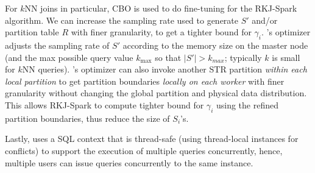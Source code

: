For $k$NN joins in particular, CBO is used to do fine-tuning for the
RKJ-Spark algorithm. We can increase the sampling rate used to
generate $S'$ and/or partition table $R$ with finer granularity, to
get a tighter bound for $\gamma_i$. \name's optimizer adjusts the
sampling rate of $S'$ according to the memory size on the master node
(and the max possible query value $k_{\max}$ so that $|S'|>k_{max}$;
typically $k$ is small for $k$NN queries). \name's optimizer can also
invoke another STR partition {\em within each local partition} to get
partition boundaries {\em locally on each worker} with finer
granularity without changing the global partition and physical data
distribution. This allows RKJ-Spark to compute tighter bound for
$\gamma_i$ using the refined partition boundaries, thus reduce the
size of $S_i$'s.


Lastly, \name uses a SQL context that is thread-safe (using
thread-local instances for conflicts) to support the execution of
multiple queries concurrently, hence, multiple users can issue queries
concurrently to the same \name instance.





